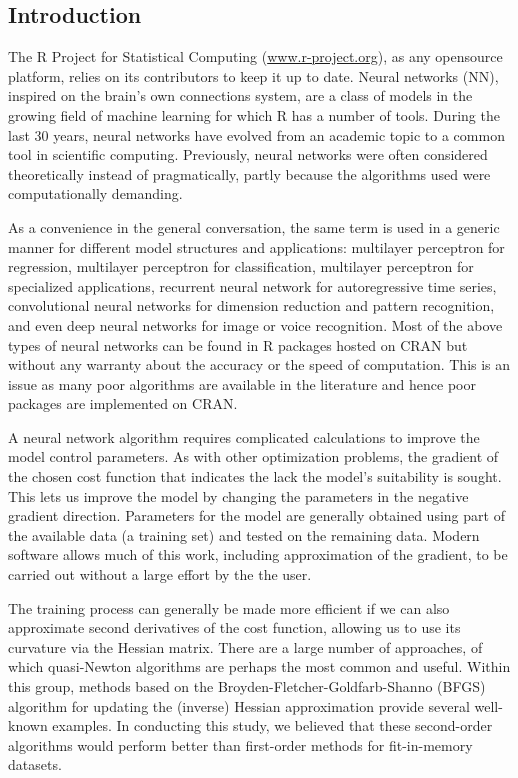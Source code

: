 \hypertarget{introduction}{%
\subsection{Introduction}\label{introduction}}

The R Project for Statistical Computing (\url{www.r-project.org}), as
any opensource platform, relies on its contributors to keep it up to
date. Neural networks (NN), inspired on the brain's own connections
system, are a class of models in the growing field of machine learning
for which R has a number of tools. During the last 30 years, neural
networks have evolved from an academic topic to a common tool in
scientific computing. Previously, neural networks were often considered
theoretically instead of pragmatically, partly because the algorithms
used were computationally demanding.

As a convenience in the general conversation, the same term is used in a
generic manner for different model structures and applications:
multilayer perceptron for regression, multilayer perceptron for
classification, multilayer perceptron for specialized applications,
recurrent neural network for autoregressive time series, convolutional
neural networks for dimension reduction and pattern recognition, and
even deep neural networks for image or voice recognition. Most of the
above types of neural networks can be found in R packages hosted on CRAN
but without any warranty about the accuracy or the speed of computation.
This is an issue as many poor algorithms are available in the literature
and hence poor packages are implemented on CRAN.

A neural network algorithm requires complicated calculations to improve
the model control parameters. As with other optimization problems, the
gradient of the chosen cost function that indicates the lack the model's
suitability is sought. This lets us improve the model by changing the
parameters in the negative gradient direction. Parameters for the model
are generally obtained using part of the available data (a training set)
and tested on the remaining data. Modern software allows much of this
work, including approximation of the gradient, to be carried out without
a large effort by the the user.

The training process can generally be made more efficient if we can also
approximate second derivatives of the cost function, allowing us to use
its curvature via the Hessian matrix. There are a large number of
approaches, of which quasi-Newton algorithms are perhaps the most common
and useful. Within this group, methods based on the
Broyden-Fletcher-Goldfarb-Shanno (BFGS) algorithm for updating the
(inverse) Hessian approximation provide several well-known examples. In
conducting this study, we believed that these second-order algorithms
would perform better than first-order methods for fit-in-memory
datasets.

